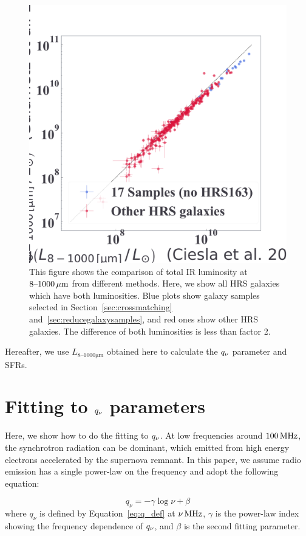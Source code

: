 \begin{figure}[htbp]
	\centering
	\includegraphics[width=.7\linewidth]{Chapter_4/Figures/Method_TIRcomparison.pdf}
    \caption[The comparison of total IR luminosities]{\label{fig:tircomparison}
        This figure shows the comparison of total IR luminosity at $8\mbox{--}1000\,\mathrm{\mu m}$ from different methods.
        Here, we show all HRS galaxies which have both luminosities.
        Blue plots show galaxy samples selected in Section~\ref{sec:crossmatching} and~\ref{sec:reducegalaxysamples}, and red ones show other HRS galaxies.
        The difference of both luminosities is less than factor 2.
    }
\end{figure}

Hereafter, we use $L_{8\mbox{--}1000\mathrm{\mu m}}$ obtained here to calculate the $q_{\nu}$ parameter and SFRs.



\section{Fitting to $q_{\nu}$ parameters}\label{sec:fittingtoq}
Here, we show how to do the fitting to $q_{\nu}$.
At low frequencies around $100\,\mathrm{MHz}$, the synchrotron radiation can be dominant, which emitted from high energy electrons accelerated by the supernova remnant.
In this paper, we assume radio emission has a single power-law on the frequency and adopt the following equation:

\begin{equation}\label{eq:q_fitting}
    q_{\nu} = -\gamma\log{\nu} + \beta
\end{equation}
where $q_{\nu}$ is defined by Equation~\ref{eq:q_def} at $\nu\,\mathrm{MHz}$, $\gamma$ is the power-law index showing the frequency dependence of $q_{\nu}$, and $\beta$ is the second fitting parameter.


